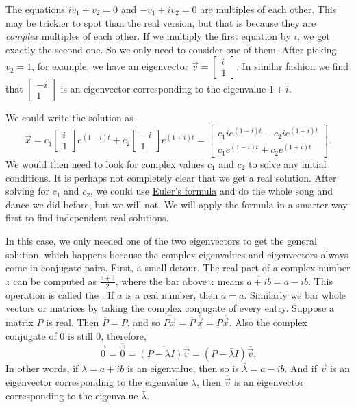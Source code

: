 The equations $i v_1 + v_2 = 0$ and $-v_1 + iv_2 = 0$
are multiples of each other. This may be trickier to spot than the real version, but that is because they are \emph{complex} multiples of each other. If we multiply the first equation by $i$, we get exactly the second one. So we only need to consider one of them.
After picking $v_2 = 1$, for example, we have an
eigenvector
$\vec{v} = \left[ \begin{smallmatrix} i \\ 1 \end{smallmatrix} \right]$.
In similar fashion we find that
$\left[ \begin{smallmatrix} -i \\ 1 \end{smallmatrix} \right]$
is an eigenvector corresponding to the eigenvalue $1+i$.

We could write the solution as
\begin{equation*}
\vec{x} =
c_1 \begin{bmatrix} i \\ 1 \end{bmatrix} e^{(1-i)t} +
c_2 \begin{bmatrix} -i \\ 1 \end{bmatrix} e^{(1+i)t}
=
\begin{bmatrix}
c_1 i e^{(1-i)t} - c_2 i e^{(1+i)t} \\
c_1 e^{(1-i)t} + c_2 e^{(1+i)t}
\end{bmatrix} .
\end{equation*}
We would then need to look for complex values $c_1$ and $c_2$ to solve
any initial conditions.  It is perhaps not completely clear
that we get a real solution.  After solving for $c_1$ and $c_2$,
we could use
\hyperref[eulersformula]{Euler's formula} and do the
whole song and dance we did before, but we will not.   We will apply
the formula in a smarter way first to find independent real solutions.

\medskip

In this case, we only needed one of the two eigenvectors to get the general solution, which happens because the complex eigenvalues and eigenvectors always come in conjugate pairs. First, a small detour.  The real part of
a complex number $z$ can be computed as $\frac{z + \bar{z}}{2}$, where
the bar above $z$ means $\overline{a+ib} = a -ib$.  This operation is called the
\emph{}.
If $a$ is a real number, then $\bar{a} = a$.
Similarly
we bar whole vectors or matrices by taking the complex conjugate
of every entry.  Suppose a matrix $P$ is real.  Then
$\overline{P} = P$, and so $\overline{P\vec{x}} = \overline{P} \,
\overline{\vec{x}} = P \overline{\vec{x}}$.
Also the complex conjugate of 0 is still 0,
therefore,
\begin{equation*}
\vec{0} = \overline{\vec{0}} = 
\overline{(P-\lambda I)\vec{v}}
=
(P-\bar{\lambda} I)\overline{\vec{v}} .
\end{equation*}
In other words, if $\lambda = a+ib$ is an eigenvalue, then so is $\bar{\lambda} = a-ib$.
And if $\vec{v}$ is an eigenvector corresponding to the eigenvalue
$\lambda$, then $\overline{\vec{v}}$ is an eigenvector corresponding
to the eigenvalue $\bar{\lambda}$.  

